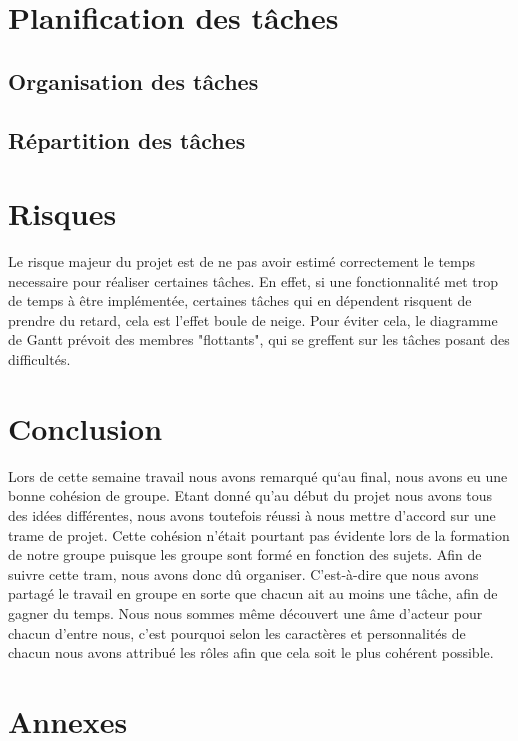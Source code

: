 \documentclass[a4paper,10pt]{article} %
\begin{document}
\section{Planification des tâches}

	\subsection{Organisation des tâches}

	\subsection{Répartition des tâches}

\section{Risques}

Le risque majeur du projet est de ne pas avoir estimé correctement le temps necessaire pour réaliser certaines tâches. En effet, si une fonctionnalité met trop de temps à être implémentée, certaines tâches qui en dépendent risquent de prendre du retard, cela est l'effet boule de neige. Pour éviter cela, le diagramme de Gantt prévoit des membres "flottants", qui se greffent sur les tâches posant des difficultés.

\section*{Conclusion}

Lors de cette semaine travail nous avons remarqué qu‘au final, nous avons eu une bonne cohésion de groupe. Etant donné qu’au début du projet nous avons tous des idées différentes, nous avons toutefois réussi à nous mettre d’accord sur une trame de projet. Cette cohésion n’était pourtant pas évidente lors de la formation de notre groupe puisque les groupe sont formé en fonction des sujets. Afin de suivre cette tram, nous avons donc dû organiser. C’est-à-dire que nous avons partagé le travail en groupe en sorte que chacun ait au moins une tâche, afin de gagner du temps. Nous nous sommes même découvert une âme d’acteur pour chacun d’entre nous, c’est pourquoi selon les caractères et personnalités de chacun nous avons attribué les rôles afin que cela soit le plus cohérent possible.

\section*{Annexes}
\end{document}
